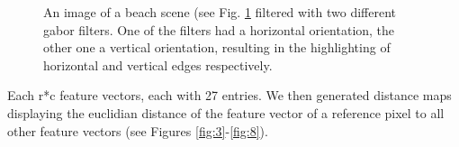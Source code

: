 \documentclass[11pt,a4paper]{article}
\begin{document}
\begin{figure}
\centering
{}
\quad
{}
\caption{An image of a beach scene (see Fig. \ref{fig:2} filtered with two different gabor filters. One of the filters had a horizontal orientation, the other one a vertical orientation, resulting in the highlighting of horizontal and vertical edges respectively.}

\label{fig:2}
\end{figure}

Each r*c feature vectors, each with 27 entries. We then generated distance maps displaying the euclidian distance of the feature vector of a reference pixel to all other feature vectors (see Figures \ref{fig:3}-\ref{fig:8}).
\end{document}
